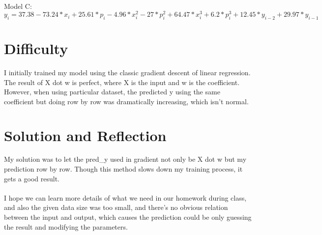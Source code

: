 \documentclass[12pt, a4paper, UTF8]{article}
\begin{document}
\paragraph {}
Model C:
$y_i = 37.38 -73.24*x_i + 25.61*p_i -4.96*x_i^2 -27*p_i^2 + 64.47*x_i^3 + 6.2*p_i^3 + 12.45*y_{i-2} + 29.97*y_{i-1} $

\section{Difficulty}
\paragraph{}
I initially trained my model using the classic gradient descent of linear regression. The result of X dot w is perfect, where X is the input and w is the coefficient. However, when using particular dataset, the predicted y using the same coefficient but doing row by row was dramatically increasing, which isn't normal.
\section{Solution and Reflection}
\paragraph{}
My solution was to let the pred\_y used in gradient not only be X dot w but my prediction row by row. Though this method slows down my training process, it gets a good result.
\paragraph{}
I hope we can learn more details of what we need in our homework during class, and also the given data size was too small, and there's no obvious relation between the input and output, which causes the prediction could be only guessing the result and modifying the parameters.
\end{document}
